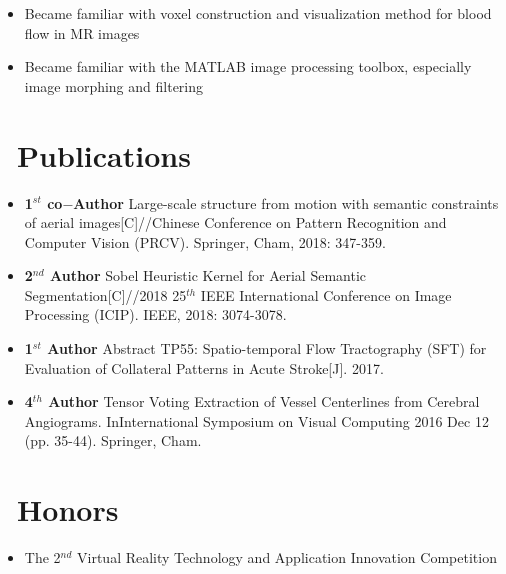 \documentclass{resume}
\begin{document}

\begin{itemize}
  \item Became familiar with voxel construction and visualization method for blood flow in MR images
  \item Became familiar with the MATLAB image processing toolbox, especially image morphing and filtering
\end{itemize}


\section{\faBookmark\ Publications}
\begin{itemize}
    \item \textbf{1$^{st}$ co$-$Author} Large-scale structure from motion with semantic constraints of aerial images[C]//Chinese Conference on Pattern Recognition and Computer Vision (PRCV). Springer, Cham, 2018: 347-359.
	\item \textbf{2$^{nd}$ Author} Sobel Heuristic Kernel for Aerial Semantic Segmentation[C]//2018 25$^{th}$ IEEE International Conference on Image Processing (ICIP). IEEE, 2018: 3074-3078.
	\item \textbf{1$^{st}$ Author} Abstract TP55: Spatio-temporal Flow Tractography (SFT) for Evaluation of Collateral Patterns in Acute Stroke[J]. 2017.
	\item \textbf{4$^{th}$ Author} Tensor Voting Extraction of Vessel Centerlines from Cerebral Angiograms. InInternational Symposium on Visual Computing 2016 Dec 12 (pp. 35-44). Springer, Cham.
\end{itemize}


\section{\faHeartO\ Honors}

\begin{itemize}
	\item The 2$^{nd}$ Virtual Reality Technology and Application Innovation Competition
\end{itemize}
\end{document}
